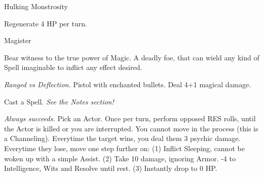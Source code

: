 \begin{monsterboxbg}{Hulking Monstrosity}
    \begin{rpg-monsteraction}
    \end{rpg-monsteraction}


    \begin{rpg-monsteraction}[Stalwart]
    \end{rpg-monsteraction}

    \begin{rpg-monsteraction}
        Regenerate 4 HP per turn.
    \end{rpg-monsteraction}


\end{monsterboxbg}



\begin{monsterboxbg}{Magister}

    Bear witness to the true power of Magic. A deadly foe, that can wield any kind of Spell imaginable to inflict any effect desired.
    
    \rpghline
    \stats[
        STR = \stat{12}, 
        DEX = \stat{14},
        CON = \stat{16},
        INT = \stat{20},
        WIS = \stat{16},
        CHA = \stat{16},
    ]
    \rpghline

    \basics[
    armorclass = 1,
    hitpoints  = 70,
    focus      = 12,
    defenses   = {Deflection 5, Reflex 5, Fortitude 6, Will 8}
    ]
    \rpghline

    \details[%
    skills = {Crafting 2, Kosmics 5, Lore 2},
    challenge = Elite,
    accuracies = {Melee 4, Ranged 6},
    ]
    \rpghline%
    

    \begin{rpg-monsteraction}
        \textit{Ranged vs Deflection.} Pistol with enchanted bullets. Deal 4+1 magical damage.
    \end{rpg-monsteraction}

    \begin{rpg-monsteraction}
        Cast a Spell. \textit{See the Notes section!}
    \end{rpg-monsteraction}

    \begin{rpg-monsteraction}[Nightmare]
        \textit{Always succeeds.} Pick an Actor. Once per turn, perform opposed RES rolls, until the Actor is killed or you are interrupted. You cannot move in the process (this is a Channeling). Everytime the target wins, you deal them 3 psychic damage. Everytime they lose, move one step further on: (1) Inflict Sleeping, cannot be woken up with a simple Assist. (2) Take 10 damage, ignoring Armor. -4 to Intelligence, Wits and Resolve until rest. (3) Instantly drop to 0 HP.
    \end{rpg-monsteraction}



\end{monsterboxbg}
